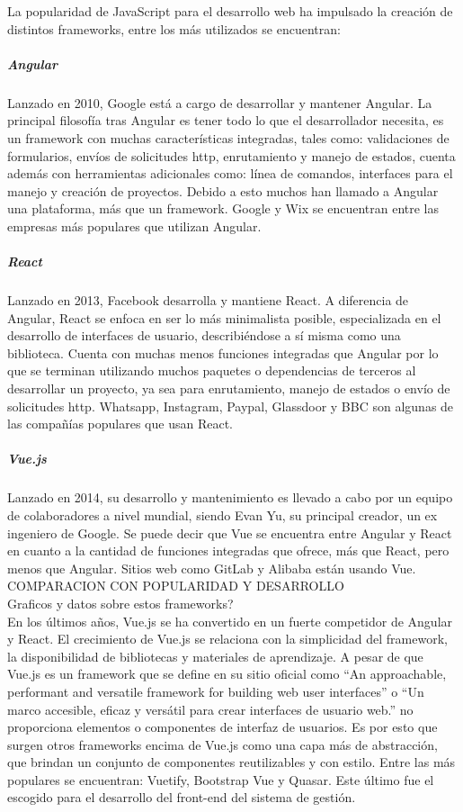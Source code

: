 La popularidad de JavaScript para el desarrollo web ha impulsado
la creación de distintos frameworks, entre los más 
utilizados se encuentran:

\subparagraph{Angular}
Lanzado en 2010, Google está a cargo de desarrollar y 
mantener Angular. La principal filosofía tras Angular es 
tener todo lo que el desarrollador necesita, es un framework
con muchas características integradas, tales como: validaciones 
de formularios, envíos de solicitudes http, enrutamiento y 
manejo de estados, cuenta además con herramientas adicionales
como: línea de comandos, interfaces para el manejo y 
creación de proyectos. Debido a esto muchos han llamado a Angular
una plataforma, más que un framework. Google y Wix se 
encuentran entre las empresas más populares que utilizan
Angular.

\subparagraph{React}
Lanzado en 2013, Facebook desarrolla y mantiene React.
A diferencia de Angular, React se enfoca en ser lo más minimalista posible,
especializada en el desarrollo de interfaces de usuario, describiéndose
a sí misma como una biblioteca. Cuenta con muchas menos funciones integradas
que Angular por lo que se terminan utilizando muchos paquetes o
dependencias de terceros al desarrollar un proyecto, ya sea para enrutamiento, manejo de estados o
envío de solicitudes http.
Whatsapp, Instagram, Paypal, Glassdoor y BBC son algunas de 
las compañías populares que usan React.

\subparagraph{Vue.js}
Lanzado en 2014, su desarrollo y mantenimiento es llevado a 
cabo por un equipo de colaboradores a nivel mundial, siendo  
Evan Yu, su principal creador, un ex ingeniero de Google.
Se puede decir que Vue se encuentra entre Angular y React en cuanto 
a la cantidad de funciones integradas que ofrece, más que React, pero 
menos que Angular. Sitios web como GitLab y Alibaba están usando Vue. \\

COMPARACION CON POPULARIDAD Y DESARROLLO\\
Graficos y datos sobre estos frameworks?\\


En los últimos años, Vue.js se ha convertido
en un fuerte competidor de Angular y React. El 
crecimiento de Vue.js se relaciona con la simplicidad 
del framework, la disponibilidad de bibliotecas
y materiales de aprendizaje. A pesar de que Vue.js es 
un framework que se define en su sitio oficial como ``An approachable, performant and versatile framework for building web user interfaces''
o ``Un marco accesible, eficaz y versátil para crear interfaces de usuario web.''
no proporciona elementos o componentes de interfaz de usuarios. Es por esto que surgen  
otros frameworks encima de Vue.js como una capa más de abstracción, que 
brindan un conjunto de componentes reutilizables y con estilo. Entre 
las más populares se encuentran: Vuetify, Bootstrap Vue y Quasar.
Este último fue el escogido para el desarrollo del front-end del sistema de gestión. 
  



